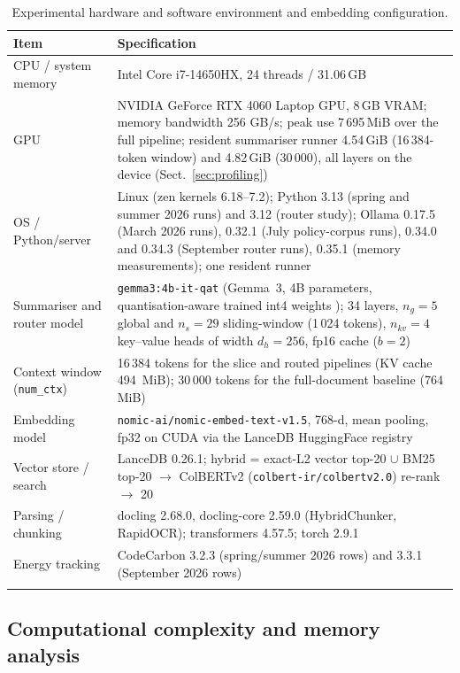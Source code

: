 \documentclass[pdflatex,sn-mathphys-num]{sn-jnl}
\theoremstyle{thmstyleone}%
\theoremstyle{thmstylethree}%
\begin{document}
\begin{table}[htbp]
\caption{Experimental hardware and software environment and embedding configuration.}\label{tab:hardware}
\begin{tabular}{@{}p{3.2cm}p{9.4cm}@{}}
\toprule
Item & Specification \\
\midrule
CPU / system memory & Intel Core i7-14650HX, 24 threads / 31.06\,GB \\
GPU & NVIDIA GeForce RTX 4060 Laptop GPU, 8\,GB VRAM; memory bandwidth 256 GB/s; peak use 7\,695\,MiB over the full pipeline; resident summariser runner 4.54\,GiB (16\,384-token window) and 4.82\,GiB (30\,000), all layers on the device (Sect.~\ref{sec:profiling}) \\
OS / Python/server & Linux (zen kernels 6.18--7.2); Python 3.13 (spring and summer 2026 runs) and 3.12 (router study); Ollama 0.17.5 (March 2026 runs), 0.32.1 (July policy-corpus runs), 0.34.0 and 0.34.3 (September router runs), 0.35.1 (memory measurements); one resident runner \\
Summariser and router model & \texttt{gemma3:4b-it-qat} (Gemma~3, 4B parameters, quantisation-aware trained int4 weights \cite{gemma3report2025,jacob2018quantization}); 34 layers, $n_g=5$ global and $n_s=29$ sliding-window (1\,024 tokens), $n_{kv}=4$ key--value heads of width $d_h=256$, fp16 cache ($b=2$) \\
Context window (\texttt{num\_ctx}) & 16\,384 tokens for the slice and routed pipelines (KV cache 494\, MiB); 30\,000 tokens for the full-document baseline (764\, MiB) \\
Embedding model & \texttt{nomic-ai/nomic-embed-text-v1.5}, 768-d, mean pooling, fp32 on CUDA via the LanceDB HuggingFace registry \\
Vector store / search & LanceDB 0.26.1; hybrid = exact-L2 vector top-20 $\cup$ BM25 top-20 $\rightarrow$ ColBERTv2 (\texttt{colbert-ir/colbertv2.0}) re-rank $\rightarrow$ 20 \\
Parsing / chunking & docling 2.68.0, docling-core 2.59.0 (HybridChunker, RapidOCR); transformers 4.57.5; torch 2.9.1 \\
Energy tracking & CodeCarbon 3.2.3 (spring/summer 2026 rows) and 3.3.1 (September 2026 rows) \\
\botrule
\end{tabular}
\end{table}

\subsection{Computational complexity and memory analysis}\label{sec:complexity}
\end{document}
